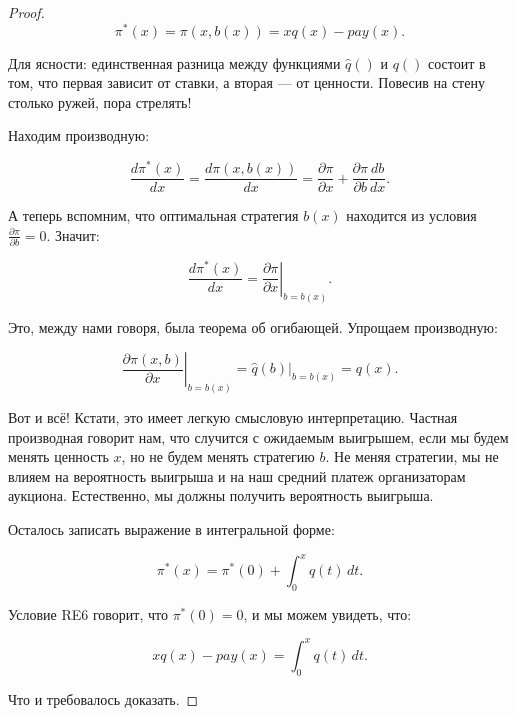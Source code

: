 \begin{proof}
\[ \pi^{*}(x)=\pi(x,b(x))=xq(x)-pay(x). \]

Для ясности: единственная разница между функциями $ \widehat{q}() $ и $ q() $ состоит в том, что первая зависит от ставки, а вторая — от ценности. Повесив на стену столько ружей, пора стрелять!

Находим производную:

\begin{equation}
\frac{d \pi^{*}(x)}{dx}=\frac{d \pi(x,b(x))}{dx}=\frac{\partial \pi}{\partial x}+\frac{\partial \pi}{\partial b}\frac{d b }{d x}.
\end{equation}

А теперь вспомним, что оптимальная стратегия $ b(x) $ находится из условия $ \frac{\partial \pi}{\partial b}=0 $. Значит:

\begin{equation}
\frac{d \pi^{*}(x)}{dx}=\left.\frac{\partial \pi}{\partial x}\right|_{b=b(x)}.
\end{equation}

Это, между нами говоря, была теорема об огибающей. Упрощаем производную:

\begin{equation}
\left.\frac{\partial \pi(x,b)}{\partial x}\right|_{b=b(x)}=\widehat{q}(b)|_{b=b(x)}=q(x).
\end{equation}

Вот и всё! Кстати, это имеет легкую смысловую интерпретацию. Частная производная говорит нам, что случится с ожидаемым выигрышем, если мы будем менять ценность $x$, но не будем менять стратегию $ b $. Не меняя стратегии, мы не влияем на вероятность выигрыша и на наш средний платеж организаторам аукциона. Ес\-тест\-вен\-но, мы должны получить вероятность выигрыша.

Осталось записать выражение в интегральной форме:

\begin{equation}
\pi^{*}(x)=\pi^{*}(0)+\int_{0}^{x}q(t) \, dt.
\end{equation}

Условие RE6 говорит, что $ \pi^{*}(0)=0 $, и мы можем увидеть, что:

\begin{equation}
xq(x)-pay(x)=\int_{0}^{x}q(t) \, dt.
\end{equation}

Что и требовалось доказать.
\end{proof}

